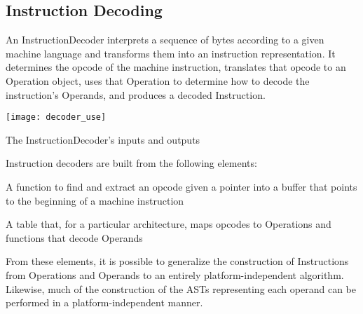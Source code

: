 \subsection{Instruction Decoding}
\label{group__instructiondecoder}
An InstructionDecoder interprets a sequence of bytes according to a given machine language and transforms them into an instruction representation. It determines the opcode of the machine instruction, translates that opcode to an Operation object, uses that Operation to determine how to decode the instruction's Operands, and produces a decoded Instruction.


\begin{DoxyImage}
\texttt{[image: decoder\_use]}
\caption{The InstructionDecoder's inputs and outputs}
\end{DoxyImage}
 Instruction decoders are built from the following elements:
\begin{DoxyItemize}
\item A function to find and extract an opcode given a pointer into a buffer that points to the beginning of a machine instruction
\item A table that, for a particular architecture, maps opcodes to Operations and functions that decode Operands
\end{DoxyItemize}

From these elements, it is possible to generalize the construction of Instructions from Operations and Operands to an entirely platform-\/independent algorithm. Likewise, much of the construction of the ASTs representing each operand can be performed in a platform-\/independent manner. 